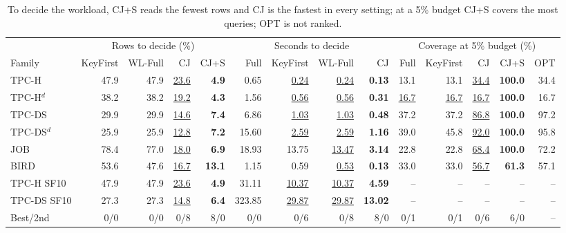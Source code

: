 \begin{table}[t]
\centering
\caption{To decide the workload, CJ+S reads the fewest rows and CJ is the fastest in every setting; at a 5\% budget CJ+S covers the most queries; OPT is not ranked.}
\label{tab:main}
\small
\setlength{\tabcolsep}{3.5pt}
\begin{tabular}{@{}lrrrrrrrrrrrrr@{}}
\toprule
 & \multicolumn{4}{c}{Rows to decide (\%)} & \multicolumn{4}{c}{Seconds to decide} & \multicolumn{5}{c}{Coverage at 5\% budget (\%)} \\ \cmidrule(lr){2-5}\cmidrule(lr){6-9}\cmidrule(l){10-14}
Family & KeyFirst & WL-Full & CJ & CJ+S & Full & KeyFirst & WL-Full & CJ & Full & KeyFirst & CJ & CJ+S & OPT \\
\midrule
TPC-H & 47.9 & 47.9 & \underline{23.6} & \textbf{4.9} & 0.65 & \underline{0.24} & \underline{0.24} & \textbf{0.13} & 13.1 & 13.1 & \underline{34.4} & \textbf{100.0} & 34.4 \\
TPC-H$^d$ & 38.2 & 38.2 & \underline{19.2} & \textbf{4.3} & 1.56 & \underline{0.56} & \underline{0.56} & \textbf{0.31} & \underline{16.7} & \underline{16.7} & \underline{16.7} & \textbf{100.0} & 16.7 \\
TPC-DS & 29.9 & 29.9 & \underline{14.6} & \textbf{7.4} & 6.86 & \underline{1.03} & \underline{1.03} & \textbf{0.48} & 37.2 & 37.2 & \underline{86.8} & \textbf{100.0} & 97.2 \\
TPC-DS$^d$ & 25.9 & 25.9 & \underline{12.8} & \textbf{7.2} & 15.60 & \underline{2.59} & \underline{2.59} & \textbf{1.16} & 39.0 & 45.8 & \underline{92.0} & \textbf{100.0} & 95.8 \\
JOB & 78.4 & 77.0 & \underline{18.0} & \textbf{6.9} & 18.93 & 13.75 & \underline{13.47} & \textbf{3.14} & 22.8 & 22.8 & \underline{68.4} & \textbf{100.0} & 72.2 \\
BIRD & 53.6 & 47.6 & \underline{16.7} & \textbf{13.1} & 1.15 & 0.59 & \underline{0.53} & \textbf{0.13} & 33.0 & 33.0 & \underline{56.7} & \textbf{61.3} & 57.1 \\
\midrule
TPC-H SF10 & 47.9 & 47.9 & \underline{23.6} & \textbf{4.9} & 31.11 & \underline{10.37} & \underline{10.37} & \textbf{4.59} & -- & -- & -- & -- & -- \\
TPC-DS SF10 & 27.3 & 27.3 & \underline{14.8} & \textbf{6.4} & 323.85 & \underline{29.87} & \underline{29.87} & \textbf{13.02} & -- & -- & -- & -- & -- \\
\midrule
Best/2nd & 0/0 & 0/0 & 0/8 & 8/0 & 0/0 & 0/6 & 0/8 & 8/0 & 0/1 & 0/1 & 0/6 & 6/0 & -- \\
\bottomrule
\end{tabular}
\end{table}
